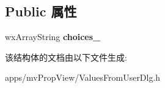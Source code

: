 \subsection*{Public 属性}
\begin{DoxyCompactItemize}
\item 
\hypertarget{struct_value_choice_data_a781cd736c6df518319a4f74e5a8b7ec8}{wx\+Array\+String {\bfseries choices\+\_\+}}\label{struct_value_choice_data_a781cd736c6df518319a4f74e5a8b7ec8}

\end{DoxyCompactItemize}


该结构体的文档由以下文件生成\+:\begin{DoxyCompactItemize}
\item 
apps/mv\+Prop\+View/Values\+From\+User\+Dlg.\+h\end{DoxyCompactItemize}
